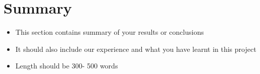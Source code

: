 \documentclass[12pt]{article}
\begin{document}
\newpage
\section{Summary}
\label{sec:summary}
\begin{itemize}
    \item This section contains summary of your results or conclusions
    \item It should also include our experience and what you have learnt in this project
    \item Length should be 300- 500 words 
\end{itemize}


\newpage 
\appendix
\end{document}
